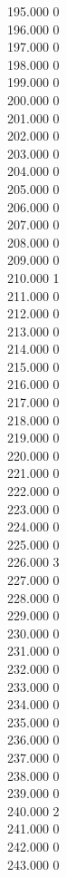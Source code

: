 { 195.000	0 \\
 196.000	0 \\
 197.000	0 \\
 198.000	0 \\
 199.000	0 \\
 200.000	0 \\
 201.000	0 \\
 202.000	0 \\
 203.000	0 \\
 204.000	0 \\
 205.000	0 \\
 206.000	0 \\
 207.000	0 \\
 208.000	0 \\
 209.000	0 \\
 210.000	1 \\
 211.000	0 \\
 212.000	0 \\
 213.000	0 \\
 214.000	0 \\
 215.000	0 \\
 216.000	0 \\
 217.000	0 \\
 218.000	0 \\
 219.000	0 \\
 220.000	0 \\
 221.000	0 \\
 222.000	0 \\
 223.000	0 \\
 224.000	0 \\
 225.000	0 \\
 226.000	3 \\
 227.000	0 \\
 228.000	0 \\
 229.000	0 \\
 230.000	0 \\
 231.000	0 \\
 232.000	0 \\
 233.000	0 \\
 234.000	0 \\
 235.000	0 \\
 236.000	0 \\
 237.000	0 \\
 238.000	0 \\
 239.000	0 \\
 240.000	2 \\
 241.000	0 \\
 242.000	0 \\
 243.000	0 \\
}
